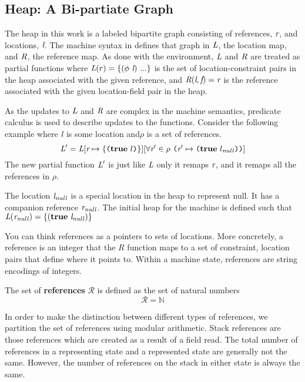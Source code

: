 \subsection{Heap: A Bi-partiate Graph} 



The heap in this work is a labeled bipartite graph consisting of
references, $\emph{r}$, and locations, $\emph{l}$. The machine
syntax in  defines that graph in
$\emph{L}$, the location map, and $\emph{R}$, the reference map. As
done with the environment, $\emph{L}$ and $\emph{R}$ are treated as
partial functions where $\cfgnt{L}(r) = \{(\phi\ \cfgnt{l})\ ...\}$ is
the set of location-constraint pairs in the heap associated with the
given reference, and $\emph{R}(\emph{l},\emph{f}) = \emph{r}$ is
the reference associated with the given location-field pair in the
heap.

As the updates to $\emph{L}$ and $\emph{R}$ are complex in the
machine semantics, predicate calculus is used to describe updates to
the functions. Consider the following example where $\emph{l}$ is
some location and$\rho$ is a set of references.
\[
\cfgnt{L}^\prime = \cfgnt{L}[\cfgnt{r} \mapsto \{\lp \cfgt{true}\ l\rp \}][\forall \cfgnt{r}^\prime \in \rho\ \lp \cfgnt{r}^\prime \mapsto \lp \cfgt{true}\ l_\mathit{null}\rp \rp ]
\]
The new partial function $\emph{L}^\prime$ is just like $\emph{L}$ only it
remaps $\emph{r}$, and it remaps all the references in $\rho$. 

The location $\emph{l}_\mathit{null}$ is a special location in the heap
to represent null. It has a companion reference
$\emph{r}_\mathit{null}$. The initial heap for the machine is defined
such that $\emph{L}(\emph{r}_\mathit{null}) = \{(\textbf{true}\ \emph{l}_\mathit{null})\}$

You can think references as a pointers to sets of locations. More concretely, a reference is an integer that the $R$ function maps to a set of constraint, location pairs that define where it points to. Within a machine state, references are string encodings of integers.

\begin{definition}
The set of \textbf{references} $\mathcal{R}$ is defined as the set of natural numbers
 $$\mathcal{R} = \mathbb{N}$$
\end{definition}

In order to make the distinction between different types of references, we partition the set of references using modular arithmetic. Stack references are those references which are created as a result of a field read. The total number of references in a representing state and a represented state are generally not the same. However, the number of references on the stack in either state is always the same. 

